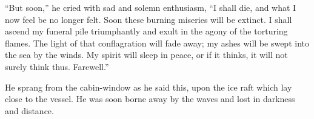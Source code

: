 \documentclass[12pt,openright]{book}
\begin{document}
“But soon,” he cried with sad and solemn enthusiasm, “I shall die, and what I now feel be no longer felt. Soon these burning miseries will be extinct. I shall ascend my funeral pile triumphantly and exult in the agony of the torturing flames. The light of that conflagration will fade away; my ashes will be swept into the sea by the winds. My spirit will sleep in peace, or if it thinks, it will not surely think thus. Farewell.”

He sprang from the cabin-window as he said this, upon the ice raft which lay close to the vessel. He was soon borne away by the waves and lost in darkness and distance.



\backmatter

\end{document}
